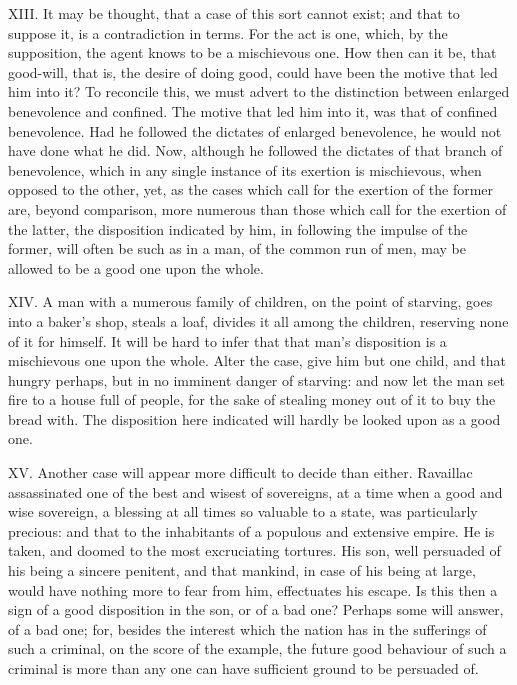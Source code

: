 \documentclass[12pt]{report}
\begin{document}
XIII. It may be thought, that a case of this sort cannot exist; and that
to suppose it, is a contradiction in terms. For the act is one, which,
by the supposition, the agent knows to be a mischievous one. How then
can it be, that good-will, that is, the desire of doing good, could have
been the motive that led him into it? To reconcile this, we must advert
to the distinction between enlarged benevolence and confined. The motive
that led him into it, was that of confined benevolence. Had he followed
the dictates of enlarged benevolence, he would not have done what he
did. Now, although he followed the dictates of that branch of
benevolence, which in any single instance of its exertion is
mischievous, when opposed to the other, yet, as the cases which call for
the exertion of the former are, beyond comparison, more numerous than
those which call for the exertion of the latter, the disposition
indicated by him, in following the impulse of the former, will often be
such as in a man, of the common run of men, may be allowed to be a good
one upon the whole.

XIV. A man with a numerous family of children, on the point of starving,
goes into a baker's shop, steals a loaf, divides it all among the
children, reserving none of it for himself. It will be hard to infer
that that man's disposition is a mischievous one upon the whole. Alter
the case, give him but one child, and that hungry perhaps, but in no
imminent danger of starving: and now let the man set fire to a house
full of people, for the sake of stealing money out of it to buy the
bread with. The disposition here indicated will hardly be looked upon as
a good one.

XV. Another case will appear more difficult to decide than either.
Ravaillac assassinated one of the best and wisest of sovereigns, at a
time when a good and wise sovereign, a blessing at all times so valuable
to a state, was particularly precious: and that to the inhabitants of a
populous and extensive empire. He is taken, and doomed to the most
excruciating tortures. His son, well persuaded of his being a sincere
penitent, and that mankind, in case of his being at large, would have
nothing more to fear from him, effectuates his escape. Is this then a
sign of a good disposition in the son, or of a bad one? Perhaps some
will answer, of a bad one; for, besides the interest which the nation
has in the sufferings of such a criminal, on the score of the example,
the future good behaviour of such a criminal is more than any one can
have sufficient ground to be persuaded of.
\end{document}
